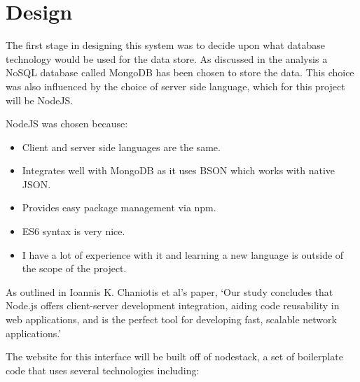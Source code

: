 \section{Design}
% 
% 
% 

The first stage in designing this system was to decide upon what database technology would be used for the data store. As discussed in the analysis a NoSQL database called MongoDB has been chosen to store the data. This choice was also influenced by the choice of server side language, which for this project will be NodeJS. 

NodeJS was chosen because:

\begin{itemize}
  \item Client and server side languages are the same.
  \item Integrates well with MongoDB as it uses BSON which works with native JSON.
  \item Provides easy package management via npm.
  \item ES6 syntax is very nice.
  \item I have a lot of experience with it and learning a new language is outside of the scope of the project.
\end{itemize}

As outlined in Ioannis K. Chaniotis et al's paper, `Our study concludes that Node.js offers client-server development integration, aiding code reusability in web applications, and is the perfect tool for developing fast, scalable network applications.'\cite{node-perf}

The website for this interface will be built off of nodestack\cite{nodestack}, a set of boilerplate code that uses several technologies including:


